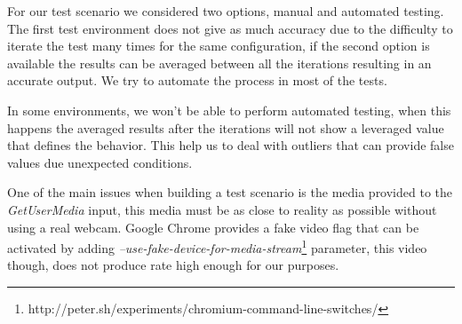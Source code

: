 For our test scenario we considered two options, manual and automated testing. The first test environment does not give as much accuracy due to the difficulty to iterate the test many times for the same configuration, if the second option is available the results can be averaged between all the iterations resulting in an accurate output. We try to automate the process in most of the tests.

In some environments, we won't be able to perform automated testing, when this happens the averaged results after the iterations will not show a leveraged value that defines the behavior. This help us to deal with outliers that can provide false values due unexpected conditions.

One of the main issues when building a test scenario is the media provided to the {\it GetUserMedia} input, this media must be as close to reality as possible without using a real webcam. Google Chrome provides a fake video flag that can be activated by adding {\it --use-fake-device-for-media-stream}\footnote{http://peter.sh/experiments/chromium-command-line-switches/} parameter, this video though, does not produce rate high enough for our purposes.


